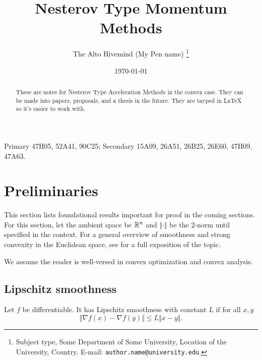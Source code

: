 \documentclass[12pt]{article}
\begin{document}
\title{{\selectfont Nesterov Type Momentum Methods}}

\author{
    The Alto Hivemind (My Pen name)
    \thanks{
        Subject type, Some Department of Some University, Location of the University,
        Country. E-mail: \texttt{author.name@university.edu}.
    }
}

\date{\today}

\maketitle


\begin{abstract} 
    \noindent
    These are notes for Nesterov Type Acceleration Methods in the convex case. 
    They can be made into papers, proposals, and a thesis in the future. 
    They are tayped in \LaTeX\; so it's easier to work with. 
\end{abstract}
Primary 47H05, 52A41, 90C25; Secondary 15A09, 26A51, 26B25, 26E60, 47H09, 47A63.

\pagebreak
\tableofcontents
\pagebreak
\section{Preliminaries}
    This section lists foundational results important for proof in the coming sections. 
    For this section, let the ambient space be $\mathbb R^n$ and $\Vert \cdot\Vert$ be the 2-norm until specified in the context. 
    For a general overview of smoothness and strong convexity in the Euclidean space, see \cite[theorem 2.1.5, theorem 2.1.10]{nesterov_lectures_2018} for a full exposition of the topic. 
    \par\noindent
    We assume the reader is well-versed in convex optimization and convex analysis. 
    \subsection{Lipschitz smoothness}
        \begin{definition}
            Let $f$ be differentiable. 
            It has Lipschitz smoothness with constant $L$ if for all $x, y$
            $$
                \Vert \nabla f(x) - \nabla f(y)\Vert 
                \le 
                L \Vert x - y\Vert. 
            $$    
        \end{definition}
\end{document}
